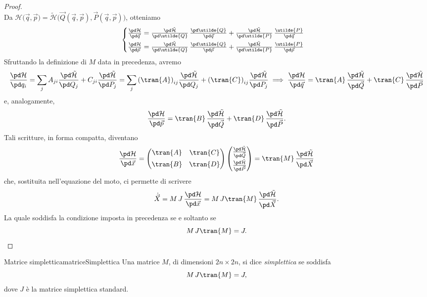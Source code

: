 \begin{proof}
\[	\]
	Da \(\mathcal{H}\big(\vec{q},\vec{p}\big) = \tilde{\mathcal{H}}\big(\vec{Q}(\vec{q},\vec{p}),\vec{P}(\vec{q},\vec{p})\big)\), otteniamo
	\[
		\begin{cases}
			\frac{\pd\mathcal{H}}{\pd\vec{q}} = \frac{\pd\tilde{\mathcal{H}}}{\pd\utilde{Q}}\,\frac{\pd\utilde{Q}}{\pd\vec{q}} + \frac{\pd\tilde{\mathcal{H}}}{\pd\utilde{P}}\,\frac{\utilde{P}}{\pd\vec{q}} \\[0.5em]
			\frac{\pd\mathcal{H}}{\pd\vec{p}} = \frac{\pd\tilde{\mathcal{H}}}{\pd\utilde{Q}}\,\frac{\pd\utilde{Q}}{\pd\vec{p}} + \frac{\pd\tilde{\mathcal{H}}}{\pd\utilde{P}}\,\frac{\utilde{P}}{\pd\vec{p}}
		\end{cases}
	\]
	Sfruttando la definizione di \(M\) data in precedenza, avremo
	\[
		\frac{\pd\mathcal{H}}{\pd q_i} = \sum_j A_{ji} \frac{\pd\tilde{\mathcal{H}}}{\pd Q_j} + C_{ji} \frac{\pd\tilde{\mathcal{H}}}{\pd P_j} = \sum_{j}{(\tran{A})}_{ij} \frac{\pd\tilde{\mathcal{H}}}{\pd Q_j} + {(\tran{C})}_{ij} \frac{\pd\tilde{\mathcal{H}}}{\pd P_j} \implies \frac{\pd\mathcal{H}}{\pd\vec{q}} = \tran{A}\,\frac{\pd\tilde{\mathcal{H}}}{\pd\vec{Q}} + \tran{C}\,\frac{\pd\tilde{\mathcal{H}}}{\pd\vec{P}}
	\]
	e, analogamente,
	\[
		\frac{\pd\mathcal{H}}{\pd\vec{p}} = \tran{B}\,\frac{\pd\tilde{\mathcal{H}}}{\pd\vec{Q}} + \tran{D}\,\frac{\pd\tilde{\mathcal{H}}}{\pd\vec{P}}.
	\]
	Tali scritture, in forma compatta, diventano
	\[
		\frac{\pd\mathcal{H}}{\pd\vec{x}} = \begin{pmatrix}
			\tran{A} & \tran{C} \\[0.5em]
			\tran{B} & \tran{D}
		\end{pmatrix}
		\begin{pmatrix}
			\frac{\pd\tilde{\mathcal{H}}}{\pd\vec{Q}} \\[0.5em]
			\frac{\pd\tilde{\mathcal{H}}}{\pd\vec{P}}
		\end{pmatrix} = \tran{M}\,\frac{\pd\tilde{\mathcal{H}}}{\pd\vec{X}}
	\]
	che, sostituita nell'equazione del moto, ci permette di scrivere
	\[
		\dot{\vec{X}} = M\,J\,\frac{\pd\mathcal{H}}{\pd\vec{x}} = M\,J \tran{M}\,\frac{\pd\tilde{\mathcal{H}}}{\pd\vec{X}}.
	\]
	La quale soddisfa la condizione imposta in precedenza se e soltanto se
	\[
		M\,J \tran{M} = J.\qedhere
	\]
\end{proof}

\begin{defn}{Matrice simplettica}{matriceSimplettica}
	Una matrice \(M\), di dimensioni \(2n \times 2n\), si dice \emph{simplettica} se soddisfa
	\[
		M\,J \tran{M} = J,
	\]
	dove \(J\) è la matrice simplettica standard.
\end{defn}

